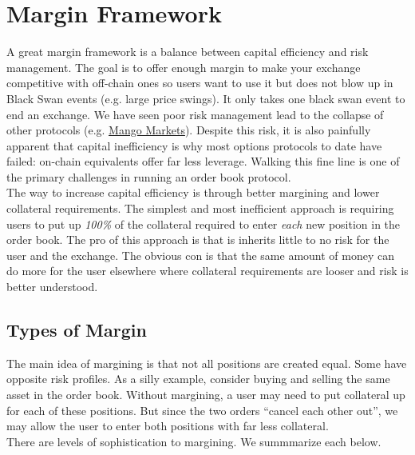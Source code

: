 \documentclass{article}
\begin{document}
\section{Margin Framework}
\label{sec:marginframework}

\noindent A great margin framework is a balance between capital efficiency and risk management. The goal is to offer enough margin to make your exchange competitive with off-chain ones so users want to use it but does not blow up in Black Swan events (e.g. large price swings).
It only takes one black swan event to end an exchange. We have seen poor risk management lead to the collapse of other protocols (e.g. \href{https://cointelegraph.com/news/100m-drained-from-solana-defi-platform-mango-markets-token-plunges-52}{Mango Markets}). 
Despite this risk, it is also painfully apparent that capital inefficiency is why most options protocols to date have failed: on-chain equivalents offer far less leverage. Walking this fine line is one of the primary challenges in running an order book protocol. \\

\noindent The way to increase capital efficiency is through better margining and lower collateral requirements. The simplest and most inefficient approach is requiring users to put up \textit{100\%} of the collateral required to enter \textit{each} new position in the order book. The pro of this approach is that is inherits little to no risk for the user and the exchange. The obvious con is that the same amount of money can do more for the user elsewhere where collateral requirements are looser and risk is better understood.

\subsection{Types of Margin}
\label{sec:margintypes}

\noindent The main idea of margining is that not all positions are created equal. Some have opposite risk profiles. As a silly example, consider buying and selling the same asset in the order book. Without margining, a user may need to put collateral up for each of these positions. But since the two orders ``cancel each other out'', we may allow the user to enter both positions with far less collateral. \\

\noindent There are levels of sophistication to margining. We summmarize each below.
\end{document}
